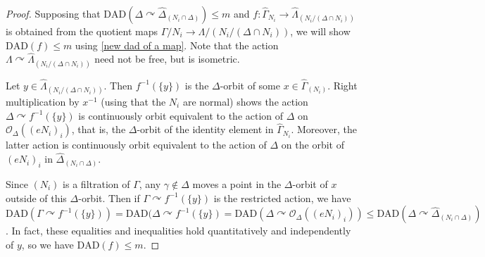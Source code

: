 \documentclass[12pt]{article}
\newcommand{\acts}{\curvearrowright}
\newcommand{\dad}{\text{DAD}}
\begin{document}
{\begin{proof}
Supposing that $\dad(\Delta\acts \widehat{\Delta}_{(N_i\cap \Delta)})\leq m$ and $f: \widehat{\Gamma}_{N_i}\to \widehat{\Lambda}_{(N_i/(\Delta\cap N_i))}$ is obtained from the quotient maps $\Gamma/N_i\to \Lambda/(N_i/(\Delta\cap N_i))$, we will show $\dad(f)\leq m$ using \ref{new dad of a map}.  Note that the action $\Lambda\acts \widehat{\Lambda}_{(N_i/(\Delta\cap N_i))}$ need not be free, but is isometric.  

Let $y\in \widehat{\Lambda}_{(N_i/(\Delta\cap N_i))}$.  Then $f^{-1}(\{y\})$ is the $\Delta$-orbit of some $x\in \widehat{\Gamma}_{(N_i)}$.  Right multiplication by $x^{-1}$ (using that the $N_i$ are normal) shows the action $\Delta\acts f^{-1}(\{y\})$ is continuously orbit equivalent to the action of $\Delta$ on $\mathcal{O}_\Delta((eN_i)_i)$, that is, the $\Delta$-orbit of the identity element in $\widehat{\Gamma}_{N_i}$.  Moreover, the latter action is continuously orbit equivalent to the action of $\Delta$ on the orbit of $(eN_i)_i$ in $\widehat{\Delta}_{(N_i\cap \Delta)}$.  

Since $(N_i)$ is a filtration of $\Gamma$, any $\gamma\notin \Delta$ moves a point in the $\Delta$-orbit of $x$ outside of this $\Delta$-orbit.  Then if $\Gamma\acts f^{-1}(\{y\})$ is the restricted action, we have $\dad(\Gamma\acts f^{-1}(\{y\})) = \dad(\Delta\acts f^{-1}(\{y\}) = \dad(\Delta\acts \mathcal{O}_{\Delta}((eN_i)_i))\leq \dad(\Delta\acts \widehat{\Delta}_{(N_i\cap \Delta)})$.  In fact, these equalities and inequalities hold quantitatively and independently of $y$, so we have $\dad(f)\leq m$.   \end{proof}



}
\end{document}
